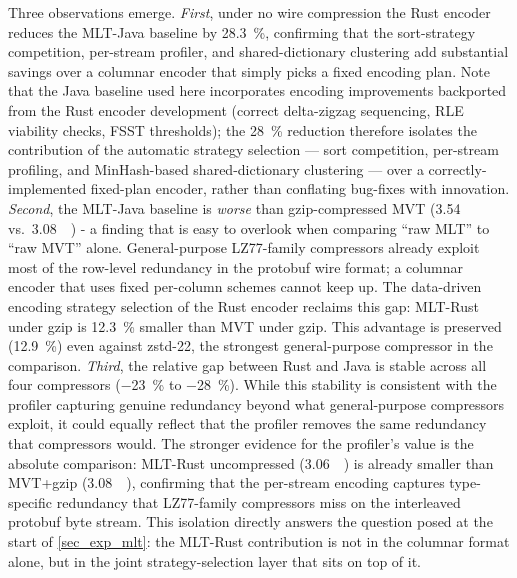 Three observations emerge.
\emph{First}, under no wire compression the Rust encoder reduces the \ac{MLT}-Java baseline by \qty{28.3}{\percent}, confirming that the sort-strategy competition, per-stream profiler, and shared-dictionary clustering add substantial savings over a columnar encoder that simply picks a fixed encoding plan.
Note that the Java baseline used here incorporates encoding improvements backported from the Rust encoder development (correct delta-zigzag sequencing, \ac{RLE} viability checks, \ac{FSST} thresholds); the \qty{28}{\percent} reduction therefore isolates the contribution of the automatic strategy selection --- sort competition, per-stream profiling, and MinHash-based shared-dictionary clustering --- over a correctly-implemented fixed-plan encoder, rather than conflating bug-fixes with innovation.
\emph{Second}, the \ac{MLT}-Java baseline is \emph{worse} than gzip-compressed \ac{MVT} (\qty{3.54}{\giga\byte} vs.\ \qty{3.08}{\giga\byte})  -  a finding that is easy to overlook when comparing \enquote{raw \ac{MLT}} to \enquote{raw \ac{MVT}} alone.
General-purpose LZ77-family compressors already exploit most of the row-level redundancy in the protobuf wire format; a columnar encoder that uses fixed per-column schemes cannot keep up.
The data-driven encoding strategy selection of the Rust encoder reclaims this gap: \ac{MLT}-Rust under gzip is \qty{12.3}{\percent} smaller than \ac{MVT} under gzip.
This advantage is preserved (\qty{12.9}{\percent}) even against zstd-22, the strongest general-purpose compressor in the comparison.
\emph{Third}, the relative gap between Rust and Java is stable across all four compressors (\qty{-23}{\percent} to \qty{-28}{\percent}).
While this stability is consistent with the profiler capturing genuine redundancy beyond what general-purpose compressors exploit, it could equally reflect that the profiler removes the same redundancy that compressors would.
The stronger evidence for the profiler's value is the absolute comparison: \ac{MLT}-Rust uncompressed (\qty{3.06}{\giga\byte}) is already smaller than \ac{MVT}+gzip (\qty{3.08}{\giga\byte}), confirming that the per-stream encoding captures type-specific redundancy that LZ77-family compressors miss on the interleaved protobuf byte stream.
This isolation directly answers the question posed at the start of \cref{sec_exp_mlt}: the \ac{MLT}-Rust contribution is not in the columnar format alone, but in the joint strategy-selection layer that sits on top of it.

